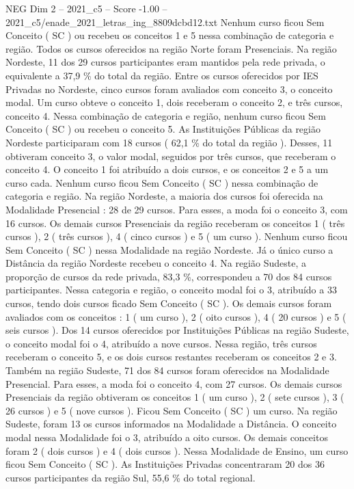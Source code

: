 \begin{textsample}{NEG Dim 2 – 2021\_c5 – Score -1.00 – 2021\_c5/enade\_2021\_letras\_ing\_8809dcbd12.txt}
Nenhum curso ficou Sem Conceito ( SC ) ou recebeu os conceitos 1 e 5 nessa combinação de categoria e região.
Todos os cursos oferecidos na região Norte foram Presenciais.
Na região Nordeste, 11 dos 29 cursos participantes eram mantidos pela rede privada, o equivalente a 37,9 \% do total da região.
Entre os cursos oferecidos por IES Privadas no Nordeste, cinco cursos foram avaliados com conceito 3, o conceito modal.
Um curso obteve o conceito 1, dois receberam o conceito 2, e três cursos, conceito 4.
Nessa combinação de categoria e região, nenhum curso ficou Sem Conceito ( SC ) ou recebeu o conceito 5.
As Instituições Públicas da região Nordeste participaram com 18 cursos ( 62,1 \% do total da região ).
Desses, 11 obtiveram conceito 3, o valor modal, seguidos por três cursos, que receberam o conceito 4.
O conceito 1 foi atribuído a dois cursos, e os conceitos 2 e 5 a um curso cada.
Nenhum curso ficou Sem Conceito ( SC ) nessa combinação de categoria e região.
Na região Nordeste, a maioria dos cursos foi oferecida na Modalidade Presencial : 28 de 29 cursos.
Para esses, a moda foi o conceito 3, com 16 cursos.
Os demais cursos Presenciais da região receberam os conceitos 1 ( três cursos ), 2 ( três cursos ), 4 ( cinco cursos ) e 5 ( um curso ).
Nenhum curso ficou Sem Conceito ( SC ) nessa Modalidade na região Nordeste.
Já o único curso a Distância da região Nordeste recebeu o conceito 4.
Na região Sudeste, a proporção de cursos da rede privada, 83,3 \%, correspondeu a 70 dos 84 cursos participantes.
Nessa categoria e região, o conceito modal foi o 3, atribuído a 33 cursos, tendo dois cursos ficado Sem Conceito ( SC ).
Os demais cursos foram avaliados com os conceitos : 1 ( um curso ), 2 ( oito cursos ), 4 ( 20 cursos ) e 5 ( seis cursos ).
Dos 14 cursos oferecidos por Instituições Públicas na região Sudeste, o conceito modal foi o 4, atribuído a nove cursos.
Nessa região, três cursos receberam o conceito 5, e os dois cursos restantes receberam os conceitos 2 e 3.
Também na região Sudeste, 71 dos 84 cursos foram oferecidos na Modalidade Presencial.
Para esses, a moda foi o conceito 4, com 27 cursos.
Os demais cursos Presenciais da região obtiveram os conceitos 1 ( um curso ), 2 ( sete cursos ), 3 ( 26 cursos ) e 5 ( nove cursos ).
Ficou Sem Conceito ( SC ) um curso.
Na região Sudeste, foram 13 os cursos informados na Modalidade a Distância.
O conceito modal nessa Modalidade foi o 3, atribuído a oito cursos.
Os demais conceitos foram 2 ( dois cursos ) e 4 ( dois cursos ).
Nessa Modalidade de Ensino, um curso ficou Sem Conceito ( SC ).
As Instituições Privadas concentraram 20 dos 36 cursos participantes da região Sul, 55,6 \% do total regional.

\end{textsample}
